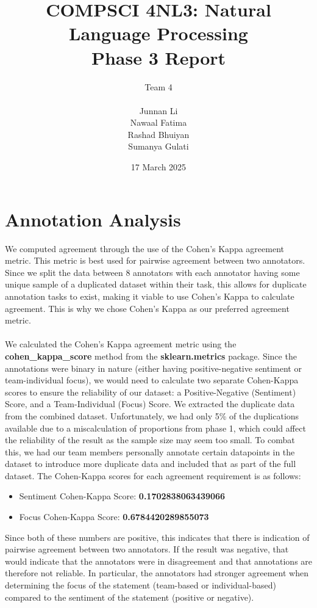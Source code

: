 \documentclass[titlepage]{article}
\title{COMPSCI 4NL3: Natural Language Processing\\
Phase 3 Report}
\author{Team 4\\
\\ Junnan Li
\\ Nawaal Fatima
\\ Rashad Bhuiyan
\\ Sumanya Gulati}
\date{17 March 2025}
\begin{document}
\begin{titlepage}
  \maketitle
\end{titlepage}

\newpage

\tableofcontents

\newpage

\section{Annotation Analysis}
We computed agreement through the use of the Cohen's Kappa agreement metric. This metric is best used for pairwise agreement between two annotators. Since we split the data between 8 annotators with each annotator having some unique sample of a duplicated dataset within their task, this allows for duplicate annotation tasks to exist, making it viable to use Cohen's Kappa to calculate agreement. This is why we chose Cohen's Kappa as our preferred agreement metric. \\ \\
We calculated the Cohen's Kappa agreement metric using the \textbf{cohen\_kappa\_score} method from the \textbf{sklearn.metrics} package. 
Since the annotations were binary in nature (either having positive-negative sentiment or team-individual focus), we would need to calculate two
separate Cohen-Kappa scores to ensure the reliability of our dataset: a Positive-Negative (Sentiment) Score, and a Team-Individual (Focus) Score.
We extracted the duplicate data from the combined dataset. Unfortunately, we had only 5\% of the duplications available due to a miscalculation of
proportions from phase 1, which could affect the reliability of the result as the sample size may seem too small. To combat this, we had our team 
members personally annotate certain datapoints in the dataset to introduce more duplicate data and included that as part of the full dataset.
The Cohen-Kappa scores for each agreement requirement is as follows:
\begin{itemize}
  \item Sentiment Cohen-Kappa Score: \textbf{0.1702838063439066}
  \item Focus Cohen-Kappa Score: \textbf{0.6784420289855073}
\end{itemize}
Since both of these numbers are positive, this indicates that there is indication of pairwise agreement between two annotators. If the result
was negative, that would indicate that the annotators were in disagreement and that annotations are therefore not reliable. In particular, the
annotators had stronger agreement when determining the focus of the statement (team-based or individual-based) compared to the sentiment of the
statement (positive or negative).
\end{document}
